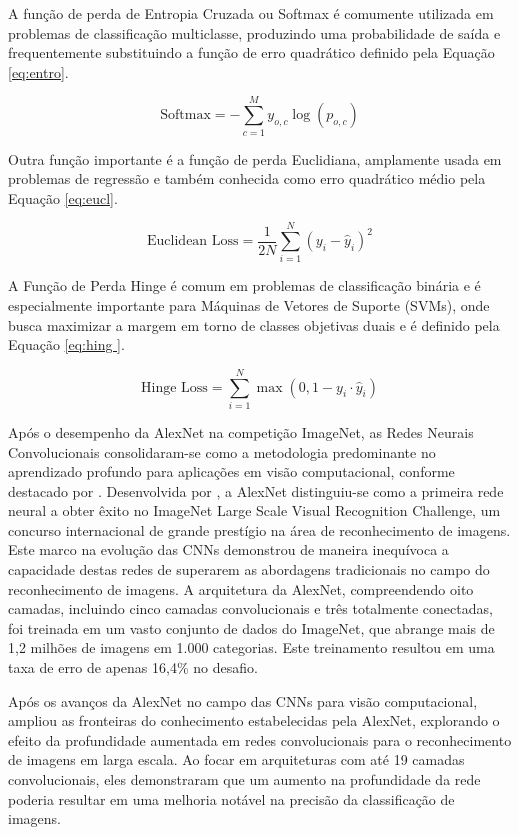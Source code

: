 A função de perda de Entropia Cruzada ou Softmax é comumente utilizada em problemas de classificação multiclasse, produzindo uma probabilidade de saída e frequentemente substituindo a função de erro quadrático definido pela Equação \ref{eq:entro}.

\begin{equation}
\text{Softmax} = -\sum_{c=1}^{M} y_{o,c} \log(p_{o,c})
\label{eq:entro}
\end{equation}

Outra função importante é a função de perda Euclidiana, amplamente usada em problemas de regressão e também conhecida como erro quadrático médio pela Equação \ref{eq:eucl}.

\begin{equation}
\text{Euclidean Loss} = \frac{1}{2N} \sum_{i=1}^{N} (y_i - \hat{y}_i)^2
\label{eq:eucl}
\end{equation}

A Função de Perda Hinge é comum em problemas de classificação binária e é especialmente importante para Máquinas de Vetores de Suporte (SVMs), onde busca maximizar a margem em torno de classes objetivas duais e é definido pela Equação \ref{eq:hing
}.

\begin{equation}
\text{Hinge Loss} = \sum_{i=1}^{N} \max(0, 1 - y_i \cdot \hat{y}_i)
\label{eq:hing
}
\end{equation}

Após o desempenho da AlexNet na competição ImageNet, as Redes Neurais Convolucionais consolidaram-se como a metodologia predominante no aprendizado profundo para aplicações em visão computacional, conforme destacado por \textcite{CHAI2021100134}. Desenvolvida por \textcite{NIPS2012_c399862d}, a AlexNet distinguiu-se como a primeira rede neural a obter êxito no ImageNet Large Scale Visual Recognition Challenge, um concurso internacional de grande prestígio na área de reconhecimento de imagens. Este marco na evolução das CNNs demonstrou de maneira inequívoca a capacidade destas redes de superarem as abordagens tradicionais no campo do reconhecimento de imagens. A arquitetura da AlexNet, compreendendo oito camadas, incluindo cinco camadas convolucionais e três totalmente conectadas, foi treinada em um vasto conjunto de dados do ImageNet, que abrange mais de 1,2 milhões de imagens em 1.000 categorias. Este treinamento resultou em uma taxa de erro de apenas 16,4\% no desafio.

Após os avanços da AlexNet no campo das CNNs para visão computacional, \textcite{https://doi.org/10.48550/arxiv.1409.1556} ampliou as fronteiras do conhecimento estabelecidas pela AlexNet, explorando o efeito da profundidade aumentada em redes convolucionais para o reconhecimento de imagens em larga escala. Ao focar em arquiteturas com até 19 camadas convolucionais, eles demonstraram que um aumento na profundidade da rede poderia resultar em uma melhoria notável na precisão da classificação de imagens. 


